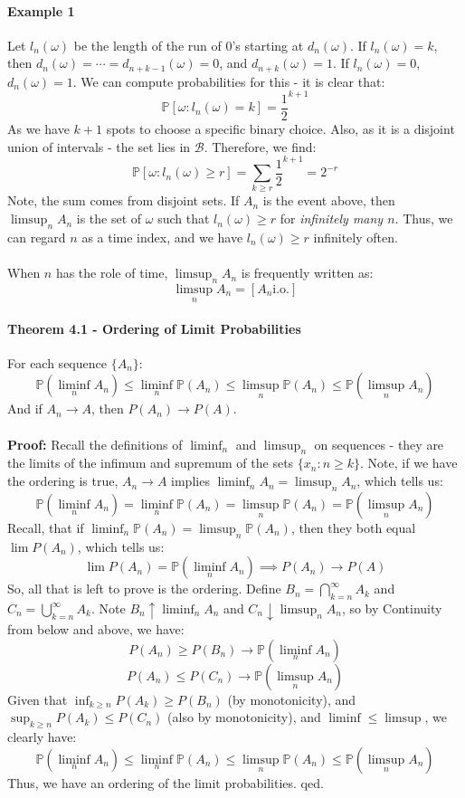 \documentclass[12pt,a4paper]{article}
\newcommand{\1}[1]{\mathbbm{1}\left\{ #1 \right\}}
\newcommand{\bcal}{\mathcal{B}}
\newcommand{\Prob}{\mathbb{P}}
\newcommand{\io}{\text{i.o.}}
\begin{document}
\paragraph{Example 1} Let $l_n(\omega)$ be the length of the run of $0$'s starting at $d_n(\omega)$. If $l_n(\omega) = k$, then $d_n(\omega) = \cdots = d_{n+k-1}(\omega) = 0$, and $d_{n+k}(\omega) = 1$. If $l_n(\omega) = 0$, $d_n(\omega) = 1$. We can compute probabilities for this - it is clear that:
$$
	\Prob[\omega: l_n(\omega) = k] = \frac{1}{2}^{k + 1}
$$
As we have $k + 1$ spots to choose a specific binary choice. Also, as it is a disjoint union of intervals - the set lies in $\bcal$. Therefore, we find:
$$
	\Prob[\omega : l_n(\omega) \geq r] = \sum_{k \geq r} \frac{1}{2}^{k + 1} = 2^{-r}
$$
Note, the sum comes from disjoint sets. If $A_n$ is the event above, then $\limsup_n A_n$ is the set of $\omega$ such that $l_n(\omega) \geq r$ for \textit{infinitely many $n$}. Thus, we can regard $n$ as a time index, and we have $l_n(\omega) \geq r$ infinitely often.
\\\\
When $n$ has the role of time, $\limsup_n A_n$ is frequently written as:
$$
	\limsup_n A_n = [A_n \io]
$$

\paragraph{Theorem 4.1 - Ordering of Limit Probabilities} For each sequence $\{A_n\}$:
$$
	\Prob\left(\liminf_n A_n\right) \leq \liminf_n \Prob(A_n) \leq
	\limsup_n \Prob(A_n) \leq \Prob\left(\limsup_n A_n\right)
$$
And if $A_n \to A$, then $P(A_n) \to P(A)$.
\\\\
\textbf{Proof:} Recall the definitions of $\liminf_n$ and $\limsup_n$ on sequences - they are the limits of the infimum and supremum of the sets $\{x_n: n \geq k\}$. Note, if we have the ordering is true, $A_n \to A$ implies $\liminf_n A_n = \limsup_n A_n$, which tells us:
$$
	\Prob\left(\liminf_n A_n\right) = \liminf_n \Prob(A_n) =
	\limsup_n \Prob(A_n) = \Prob\left(\limsup_n A_n\right)
$$
Recall, that if $\liminf_n \Prob(A_n) = \limsup_n \Prob(A_n)$, then they both equal $\lim P(A_n)$, which tells us:
$$
	\lim P(A_n) = \Prob\left(\liminf_n A_n\right) \implies P(A_n) \to P(A)
$$
So, all that is left to prove is the ordering. Define $B_n = \bigcap_{k=n}^\infty A_k$ and $C_n = \bigcup_{k=n}^\infty A_k$. Note $B_n \uparrow \liminf_n A_n$ and $C_n \downarrow \limsup_n A_n$, so by Continuity from below and above, we have:
$$
	P(A_n) \geq P(B_n) \to \Prob\left(\liminf_n A_n\right)
$$
$$
	P(A_n) \leq P(C_n) \to \Prob\left(\limsup_n A_n\right)
$$
Given that $\inf_{k \geq n} P(A_k) \geq P(B_n)$ (by monotonicity), and $\sup_{k \geq n} P(A_k) \leq P(C_n)$ (also by monotonicity), and $\liminf \leq \limsup$, we clearly have:
$$
	\Prob\left(\liminf_n A_n\right) \leq \liminf_n \Prob(A_n) \leq
	\limsup_n \Prob(A_n) \leq \Prob\left(\limsup_n A_n\right)
$$
Thus, we have an ordering of the limit probabilities. qed.
\end{document}
